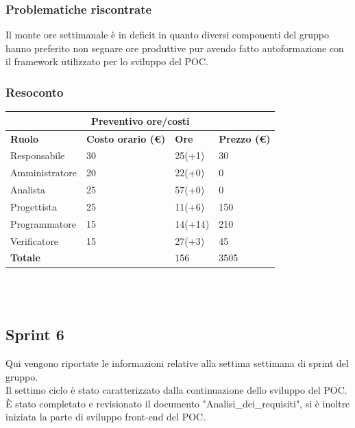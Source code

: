 \documentclass[10pt]{article}
\begin{document}
\subsubsection{Problematiche riscontrate}
Il monte ore settimanale è in deficit in quanto diversi componenti del gruppo hanno preferito non segnare ore produttive pur avendo fatto autoformazione con il framework utilizzato per lo sviluppo del POC.
\subsubsection{Resoconto}
\begin{center}
	\begin{tabularx}{\textwidth}{|X|X|X|X|}
		\hline
		\multicolumn{4}{|c|}{\textbf{Preventivo ore/costi}}                                      \\
		\hline
		\hline
		\textbf{Ruolo}  & \textbf{Costo orario (\euro)} & \textbf{Ore} & \textbf{Prezzo (\euro)} \\
		\hline
		Responsabile    & 30                            & 25(+1)       & 30                      \\
		\hline
		Amministratore  & 20                            & 22(+0)       & 0                       \\
		\hline
		Analista        & 25                            & 57(+0)       & 0                       \\
		\hline
		Progettista     & 25                            & 11(+6)       & 150                     \\
		\hline
		Programmatore   & 15                            & 14(+14)      & 210                     \\
		\hline
		Verificatore    & 15                            & 27(+3)       & 45                      \\
		\hline
		\hline
		\textbf{Totale} &                               & 156          & 3505                    \\
		\hline
	\end{tabularx}\\[8pt]
	\mbox{}\\
\end{center}

\subsection{Sprint 6}
Qui vengono riportate le informazioni relative alla settima settimana di sprint del gruppo. \\
Il settimo ciclo è stato caratterizzato dalla continuazione dello sviluppo del POC. \\
È stato completato e revisionato il documento "Analisi\_dei\_requisiti", si è inoltre iniziata la parte di sviluppo front-end del POC.
\end{document}
